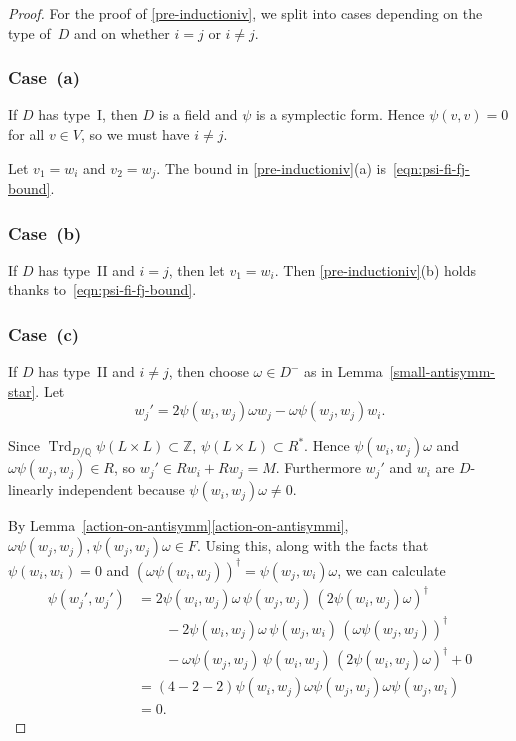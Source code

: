 \documentclass[11pt]{article}
\numberwithin{equation}{section}
\newcommand{\bQ}{\mathbb{Q}}
\newcommand{\bZ}{\mathbb{Z}}
\DeclareMathOperator{\Trd}{Trd}
\begin{document}
\begin{proof}
For the proof of \eqref{pre-inductioniv}, we split into cases depending on the type of~$D$ and on whether $i=j$ or $i \neq j$.

\subsubsection*{Case~(a)}

If $D$ has type~I, then $D$ is a field and $\psi$ is a symplectic form.
Hence $\psi(v,v) = 0$ for all $v \in V$, so we must have $i \neq j$.

Let $v_1 = w_i$ and $v_2 = w_j$.
The bound in \eqref{pre-inductioniv}(a) is~\eqref{eqn:psi-fi-fj-bound}.

\subsubsection*{Case~(b)}

If $D$ has type~II and $i=j$, then let $v_1 = w_i$.
Then \eqref{pre-inductioniv}(b) holds thanks to~\eqref{eqn:psi-fi-fj-bound}.

\subsubsection*{Case~(c)}
If $D$ has type~II and $i \neq j$, then choose $\omega \in D^-$ as in Lemma~\ref{small-antisymm-star}.
Let\vspace*{-3pt}
\[
w_j' = 2\psi(w_i, w_j)\omega w_j - \omega\psi(w_j, w_j) w_i.
\]

\pagebreak[2]
\noindent
Since $\Trd_{D/\bQ} \psi(L \times L) \subset \bZ$, $\psi(L \times L) \subset R^*$.
Hence $\psi(w_i, w_j)\omega$ and $\omega\psi(w_j, w_j) \in R$, so $w_j' \in Rw_i + Rw_j = M$.
Furthermore $w_j'$ and $w_i$ are $D$-linearly independent because $\psi(w_i, w_j)\omega \neq 0$.

By Lemma~\ref{action-on-antisymm}\eqref{action-on-antisymmi}, $\omega\psi(w_j, w_j), \psi(w_j, w_j)\omega \in F$.
Using this, along with the facts that $\psi(w_i,w_i) = 0$ and $(\omega \psi(w_i, w_j))^\dag = \psi(w_j, w_i) \omega$, we can calculate
\begin{align*}
\psi(w_j', w_j')
& = 2\psi(w_i, w_j) \omega \, \psi(w_j, w_j) \, (2\psi(w_i, w_j) \omega)^\dag
\\& \qquad - 2\psi(w_i, w_j) \omega \, \psi(w_j, w_i) \, (\omega \psi(w_j, w_j))^\dag
\\& \qquad - \omega \psi(w_j, w_j) \, \psi(w_i, w_j) \, (2\psi(w_i, w_j) \omega)^\dag
+ 0
\\& = (4-2-2) \psi(w_i, w_j) \omega \psi(w_j, w_j) \omega \psi(w_j, w_i)
\\& = 0.
\end{align*}


\end{proof}
\end{document}
